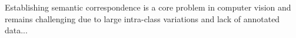 \begin{abstract}[flattitle]
    建立语义匹配关系是计算机视觉中的核心问题。……
\end{abstract}

\begin{abstract*}[flattitle]
Establishing semantic correspondence is a core problem in computer vision and remains challenging due to large intra-class variations and lack of annotated data...
\end{abstract*}